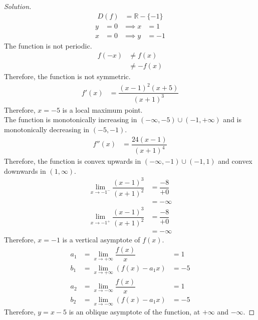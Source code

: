 \documentclass[fleqn]{article}
\theoremstyle{definition}
\theoremstyle{theorem}
\theoremstyle{remark}
\newenvironment{solution}
{\begin{proof}[Solution]\let\qed\relax}
	{\end{proof}}
\begin{document}
\begin{solution}
	\begin{align*}
		D(f) &= \mathbb{R} - \{-1\}
	\end{align*}
	\begin{align*}
		y &= 0 &\implies x &= 1\\
		x &= 0 &\implies y &= -1
	\end{align*}
	The function is not periodic.
	\begin{align*}
		f(-x) &\neq f(x) \\
				&\neq -f(x) 
	\end{align*}
	Therefore, the function is not symmetric.
	\begin{align*}
		f'(x) &= \dfrac{(x-1)^2 (x+5)}{(x+1)^3}
	\end{align*}
	Therefore, $x = -5$ is a local maximum point.\\
	The function is monotonically increasing in $(-\infty, -5) \cup (-1, +\infty)$ and is monotonically decreasing in $(-5, -1)$.
	\begin{align*}
		f''(x) &= \dfrac{24(x-1)}{(x+1)^4}
	\end{align*}
	Therefore, the function is convex upwards in $(-\infty, -1) \cup (-1, 1)$ and convex downwards in $(1, \infty)$.
	\begin{align*}
		\lim\limits_{x \to -1^-} \dfrac{(x-1)^3}{(x+1)^2} &= \dfrac{-8}{+0}\\
		&= -\infty\\
		\lim\limits_{x \to -1^+} \dfrac{(x-1)^3}{(x+1)^2} &= \dfrac{-8}{+0}\\
		&= -\infty
	\end{align*}
	Therefore, $x = -1$ is a vertical asymptote of $f(x)$.
	\begin{align*}
		a_1 &= \lim\limits_{x \to +\infty} \dfrac{f(x)}{x} &= 1\\
		b_1 &= \lim\limits_{x \to +\infty} \left(f(x) - a_1 x\right) &= -5\\
		a_2 &= \lim\limits_{x \to -\infty} \dfrac{f(x)}{x} &= 1\\
		b_2 &= \lim\limits_{x \to -\infty} \left(f(x) - a_1 x\right) &= -5
	\end{align*}
	Therefore, $y = x - 5$ is an oblique asymptote of the function, at $+\infty$ and $-\infty$.
	
\end{solution}
\end{document}

